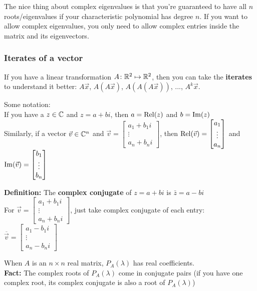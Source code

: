 The nice thing about complex eigenvalues is that you're guaranteed to have all $n$ roots/eigenvalues if your characteristic polynomial has degree $n$. If you want to allow complex eigenvalues, you only need to allow complex entries inside the matrix and its eigenvectors.

\subsubsection*{Iterates of a vector}

If you have a linear transformation $A \colon \mathbb{R}^2 \mapsto \mathbb{R}^2$, then you can take the \textbf{iterates} to understand it better: $A\Vec x$, $A(A\Vec x)$, $A(A(A\Vec x))$, ..., $A^k\Vec x$.

Some notation:\\
If you have a $z \in \mathbb{C}$ and $z = a+bi$, then $a = \operatorname{Rel}(z)$ and $b = \operatorname{Im}(z)$\\
Similarly, if a vector $\Vec v \in \mathbb{C}^n$ and $\Vec v = \begin{bmatrix}a_1 + b_1 i \\ \vdots \\ a_n + b_n i\end{bmatrix}$, then $\operatorname{Rel}(\Vec v) = \begin{bmatrix}a_1 \\ \vdots \\ a_n\end{bmatrix}$ and $\operatorname{Im}(\Vec v) = \begin{bmatrix}b_1 \\ \vdots \\ b_n\end{bmatrix}$

\textbf{Definition:} The \textbf{complex conjugate} of $z = a+bi$ is $\bar z = a-bi$\\
For $\Vec v = \begin{bmatrix}a_1 + b_1 i \\ \vdots \\ a_n + b_n i\end{bmatrix}$, just take complex conjugate of each entry: $\overline{\Vec v} = \begin{bmatrix}a_1 - b_1 i \\ \vdots \\ a_n - b_n i\end{bmatrix}$

When $A$ is an $n \times n$ real matrix, $P_A(\lambda)$ has real coefficients.\\
\textbf{Fact:} The complex roots of $P_A(\lambda)$ come in conjugate pairs (if you have one complex root, its complex conjugate is also a root of $P_A(\lambda)$)

